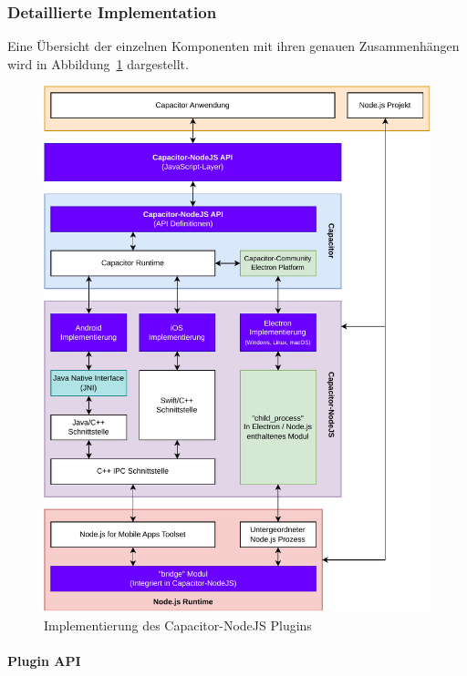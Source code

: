 \subsubsection{Detaillierte Implementation}

Eine Übersicht der einzelnen Komponenten mit ihren genauen Zusammenhängen wird in Abbildung~\ref{asset:Capacitor-NodeJS:Implementation} dargestellt.

\begin{figure}[H]
  \centering
  \vspace{1em}
  \includegraphics[width=\textwidth]{assets/02_Capacitor-NodeJS/04_Implementation.drawio.pdf}
  \caption[Capacitor-NodeJS / Implementierung]{Implementierung des Capacitor-NodeJS Plugins}
  \label{asset:Capacitor-NodeJS:Implementation}
\end{figure}

\newpage

\paragraph{Plugin API}

